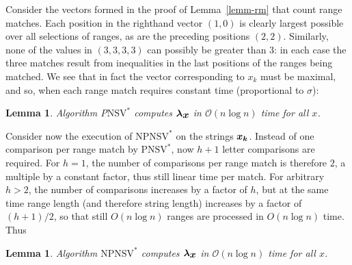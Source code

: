 \documentclass[10pt]{llncs}
\newtheorem{lemm}[thrm]{Lemma}
\def\s#1{\mbox{\boldmath $#1$}}
\def\+{\!+\!}
\def\O{\mathcal{O}}
\def\NSV{\mbox{NSV}}
\def\PNSV{\mbox{PNSV}}
\def\NPNSV{\mbox{NPNSV}}
\begin{document}
Consider the vectors formed in the proof of Lemma~\ref{lemm-rm}
that count range matches.
Each position in the righthand vector $(1,0)$
is clearly largest possible
over all selections of ranges,
as are the preceding positions $(2,2)$.
Similarly, none of the values in $(3,3,3,3)$ can possibly be greater than 3:
in each case the three matches result from inequalities in the last positions
of the ranges being matched.
We see that in fact the vector corresponding to \s{x_k} must be maximal, and so,
when each range match requires constant time
(proportional to $\sigma$):
\begin{lemm}
\label{lemm-pnsv}
Algorithm P$\NSV^*$ computes $\s{\lambda}_{\s{x}}$ in $\O(n\log n)$ time for all \s{x}.
\end{lemm}
Consider now the execution of $\NPNSV^*$ on the strings $\s{x_k}$.
Instead of one comparison per range match by $\PNSV^*$,
now $h\+ 1$ letter comparisons are required.
For $h = 1$, the number of comparisons per range match
is therefore $2$, a multiple by a constant factor,
thus still linear time per match.
For arbitrary $h > 2$, the number of comparisons increases
by a factor of $h$, but at the same time range length
(and therefore string length) increases by a factor of $(h\+ 1)/2$,
so that still $O(n\log n)$ ranges are processed
in $O(n\log n)$ time.
Thus
\begin{lemm}
\label{lemm-npnsv}
Algorithm $\NPNSV^*$ computes $\s{\lambda}_{\s{x}}$
in $\O(n\log n)$ time for all \s{x}.
\end{lemm}
\end{document}
